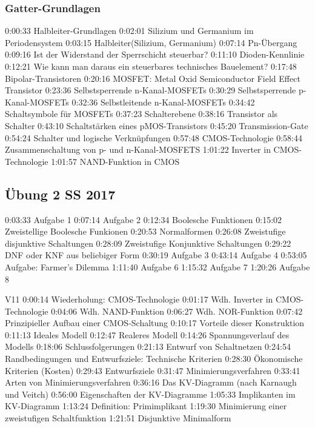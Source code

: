 \documentclass[a4paper]{scrartcl}
\begin{document}
		\subsubsection{Gatter-Grundlagen}
		0:00:33 Halbleiter-Grundlagen 
		0:02:01 Silizium und Germanium im Periodensystem 
		0:03:15 Halbleiter(Silizium, Germanium) 
		0:07:14 Pn-Übergang 
		0:09:16 Ist der Widerstand der Sperrschicht steuerbar? 
		0:11:10 Dioden-Kennlinie 
		0:12:21 Wie kann man daraus ein steuerbares technisches Bauelement? 
		0:17:48 Bipolar-Transistoren 
		0:20:16 MOSFET: Metal Oxid Semiconductor Field Effect Transistor 
		0:23:36 Selbstsperrende n-Kanal-MOSFETs 0:30:29 Selbstsperrende p-Kanal-MOSFETs 
		0:32:36 Selbstleitende n-Kanal-MOSFETs 0:34:42 Schaltsymbole für MOSFETs 
		0:37:23 Schalterebene 
		0:38:16 Transistor als Schalter 
		0:43:10 Schaltstärken eines pMOS-Transistors 
		0:45:20 Transmission-Gate 
		0:54:24 Schalter und logische Verknüpfungen 
		0:57:48 CMOS-Technologie 
		0:58:44 Zusammenschaltung von p- und n-Kanal-MOSFETS 
		1:01:22 Inverter in CMOS-Technologie 
		1:01:57 NAND-Funktion in CMOS
		
		\subsection{Übung 2 SS 2017}
		0:03:33 Aufgabe 1 
		0:07:14 Aufgabe 2 
		0:12:34 Boolesche Funktionen 
		0:15:02 Zweistellige Boolesche Funkionen 
		0:20:53 Normalformen 
		0:26:08 Zweistufige disjunktive Schaltungen 
		0:28:09 Zweistufige Konjunktive Schaltungen 
		0:29:22 DNF oder KNF aus beliebiger Form 
		0:30:19 Aufgabe 3 
		0:43:14 Aufgabe 4 
		0:53:05 Aufgabe: Farmer's Dilemma 
		1:11:40 Aufgabe 6 
		1:15:32 Aufgabe 7 
		1:20:26 Aufgabe 8 
		
		V11
		0:00:14 Wiederholung: CMOS-Technologie 
		0:01:17 Wdh. Inverter in CMOS-Technologie 
		0:04:06 Wdh. NAND-Funktion 
		0:06:27 Wdh. NOR-Funktion 
		0:07:42 Prinzipieller Aufbau einer CMOS-Schaltung 
		0:10:17 Vorteile dieser Konstruktion 
		0:11:13 Ideales Modell 
		0:12:47 Realeres Modell 
		0:14:26 Spannungsverlauf des Modells 
		0:18:06 Schlussfolgerungen 
		0:21:13 Entwurf von Schaltnetzen 
		0:24:54 Randbedingungen und Entwurfsziele: Technische Kriterien 
		0:28:30 Ökonomische Kriterien (Kosten) 
		0:29:43 Entwurfsziele 
		0:31:47 Minimierungsverfahren 
		0:33:41 Arten von Minimierungsverfahren 
		0:36:16 Das KV-Diagramm (nach Karnaugh und Veitch) 
		0:56:00 Eigenschaften der KV-Diagramme 
		1:05:33 Implikanten im KV-Diagramm 
		1:13:24 Definition: Primimplikant 
		1:19:30 Minimierung einer zweistufigen Schaltfunktion 
		1:21:51 Disjunktive Minimalform
		
\end{document}
